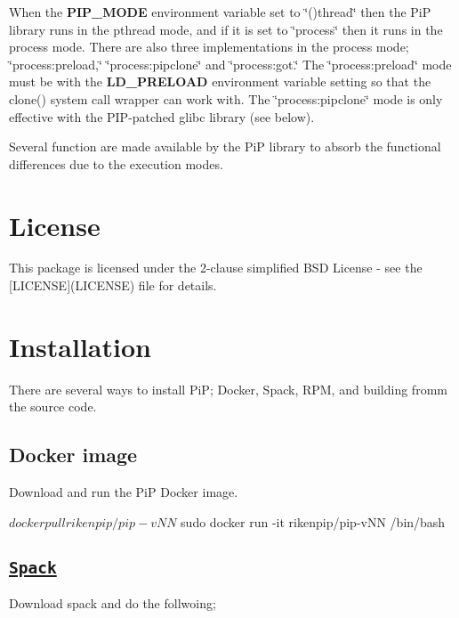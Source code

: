 When the {\bfseries P\-I\-P\-\_\-\-M\-O\-D\-E} environment variable set to \char`\"{}()thread\char`\"{} then the Pi\-P library runs in the pthread mode, and if it is set to \char`\"{}process\char`\"{} then it runs in the process mode. There are also three implementations in the process mode; \char`\"{}process\-:preload,\char`\"{} \char`\"{}process\-:pipclone\char`\"{} and \char`\"{}process\-:got.\char`\"{} The \char`\"{}process\-:preload\char`\"{} mode must be with the {\bfseries L\-D\-\_\-\-P\-R\-E\-L\-O\-A\-D} environment variable setting so that the clone() system call wrapper can work with. The \char`\"{}process\-:pipclone\char`\"{} mode is only effective with the P\-I\-P-\/patched glibc library (see below).

Several function are made available by the Pi\-P library to absorb the functional differences due to the execution modes.

\section*{License}

This package is licensed under the 2-\/clause simplified B\-S\-D License -\/ see the \mbox{[}L\-I\-C\-E\-N\-S\-E\mbox{]}(L\-I\-C\-E\-N\-S\-E) file for details.

\section*{Installation}

There are several ways to install Pi\-P; Docker, Spack, R\-P\-M, and building fromm the source code.

\subsection*{Docker image}

Download and run the Pi\-P Docker image. \begin{DoxyVerb}$ docker pull rikenpip/pip-vNN
$ sudo docker run -it rikenpip/pip-vNN /bin/bash
\end{DoxyVerb}


\subsection*{\href{https://spack.readthedocs.io/}{\tt Spack}}

Download spack and do the follwoing; 


